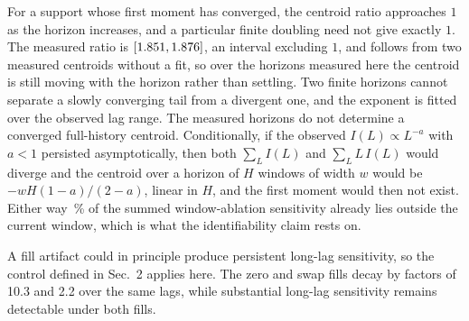 \documentclass[10pt,twocolumn,letterpaper]{article}
\begin{document}
For a support whose first moment has converged, the centroid ratio approaches $1$ as the horizon
increases, and a
particular finite doubling need not give exactly $1$. The measured ratio is \tailRatio{}
$[1.851,1.876]$, an interval excluding $1$, and follows from
two measured centroids without a fit, so over the horizons measured here the centroid is
still moving with the horizon rather than settling. Two finite horizons cannot separate a
slowly converging tail from a divergent one, and the exponent is fitted over the observed
lag range. The measured horizons do not determine a converged full-history centroid.
Conditionally, if the observed
$I(L)\propto L^{-a}$ with $a<1$ persisted asymptotically, then both $\sum_L I(L)$ and
$\sum_L L\,I(L)$ would diverge and the centroid over a horizon of $H$ windows of width $w$
would be $-wH(1-a)/(2-a)$, linear in $H$, and the first moment would then not exist. Either way
\tailOutside\,\% of the summed window-ablation sensitivity already lies outside the current window, which is
what the identifiability claim rests on.

A fill artifact could in principle produce persistent long-lag sensitivity, so the control
defined in Sec.~2 applies here. The zero and swap fills decay by factors of 10.3 and 2.2 over
the same lags, while substantial long-lag sensitivity remains detectable under both fills.
\end{document}
